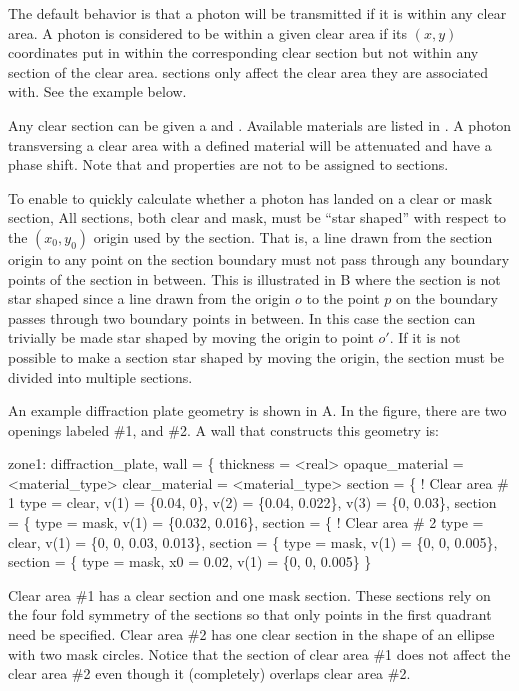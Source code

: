 The default behavior is that a photon will be transmitted if it is
within any clear area. A photon is considered to be within a given
clear area if its $(x,y)$ coordinates put in within the corresponding
clear section but not within any  section of the clear area.
 sections only affect the clear area they are associated
with. See the example below.

Any clear section can be given a  and
. Available materials are listed in
. A photon transversing a clear area with a defined
material will be attenuated and have a phase shift. Note that
 and  properties are not to be assigned to
 sections.

To enable \bmad to quickly calculate whether a photon has landed on a
clear or mask section, All sections, both clear and mask, must be
``star shaped'' with respect to the $(x_0, y_0)$ origin used by the
section. That is, a line drawn from the section origin to any point on
the section boundary must not pass through any boundary points of the
section in between. This is illustrated in B where
the section is not star shaped since a line drawn from the origin $o$
to the point $p$ on the boundary passes through two boundary points in
between. In this case the section can trivially be made star shaped by
moving the origin to point $o'$. If it is not possible to make a
section star shaped by moving the origin, the section must be divided
into multiple sections.

An example diffraction plate geometry is shown in A.
In the figure, there are two openings labeled \#1, and \#2. A
wall that constructs this geometry is:
\begin{example}
  zone1: diffraction_plate, wall = \{
    thickness = <real>
    opaque_material = <material_type>
    clear_material = <material_type>
    section = \{           ! Clear area \# 1
      type = clear, 
      v(1) = \{0.04, 0\}, v(2) = \{0.04, 0.022\},
      v(3) = \{0, 0.03\},
    section = \{
      type = mask,
      v(1) = \{0.032, 0.016\},
    section = \{          ! Clear area \# 2
      type = clear,
      v(1) = \{0, 0, 0.03, 0.013\},
    section = \{
      type = mask,
      v(1) = \{0, 0, 0.005\},
    section = \{
      type = mask,
      x0 = 0.02,
      v(1) = \{0, 0, 0.005\} \}
\end{example}
Clear area \#1 has a clear section and one mask section. These
sections rely on the four fold symmetry of the sections so that only
points in the first quadrant need be specified. Clear area \#2 has one
clear section in the shape of an ellipse with two mask circles. Notice
that the  section of clear area \#1 does not affect the clear
area \#2 even though it (completely) overlaps clear area \#2.

